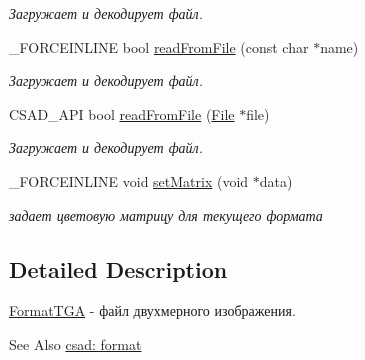 \begin{DoxyCompactItemize}
\begin{DoxyCompactList}\small\item\em Загружает и декодирует файл. \end{DoxyCompactList}\item 
\hypertarget{classcsad_1_1_format_t_g_a_a62b2c3c00b00b90aa8f88b0f503a6be3}{\-\_\-\-F\-O\-R\-C\-E\-I\-N\-L\-I\-N\-E bool \hyperlink{classcsad_1_1_format_t_g_a_a62b2c3c00b00b90aa8f88b0f503a6be3}{read\-From\-File} (const char $\ast$name)}\label{classcsad_1_1_format_t_g_a_a62b2c3c00b00b90aa8f88b0f503a6be3}

\begin{DoxyCompactList}\small\item\em Загружает и декодирует файл. \end{DoxyCompactList}\item 
\hypertarget{classcsad_1_1_format_t_g_a_a76b4094f054b922ce42ddf0dadc5e32c}{C\-S\-A\-D\-\_\-\-A\-P\-I bool \hyperlink{classcsad_1_1_format_t_g_a_a76b4094f054b922ce42ddf0dadc5e32c}{read\-From\-File} (\hyperlink{classcsad_1_1_file}{File} $\ast$file)}\label{classcsad_1_1_format_t_g_a_a76b4094f054b922ce42ddf0dadc5e32c}

\begin{DoxyCompactList}\small\item\em Загружает и декодирует файл. \end{DoxyCompactList}\item 
\hypertarget{classcsad_1_1_format_t_g_a_a81605ff0a5fbf281117efcf250a1e54b}{\-\_\-\-F\-O\-R\-C\-E\-I\-N\-L\-I\-N\-E void \hyperlink{classcsad_1_1_format_t_g_a_a81605ff0a5fbf281117efcf250a1e54b}{set\-Matrix} (void $\ast$data)}\label{classcsad_1_1_format_t_g_a_a81605ff0a5fbf281117efcf250a1e54b}

\begin{DoxyCompactList}\small\item\em задает цветовую матрицу для текущего формата \end{DoxyCompactList}\end{DoxyCompactItemize}


\subsection{Detailed Description}
\hyperlink{classcsad_1_1_format_t_g_a}{Format\-T\-G\-A} -\/ файл двухмерного изображения. 

\begin{DoxySeeAlso}{See Also}
\hyperlink{group__format}{csad\-: format} 
\end{DoxySeeAlso}

